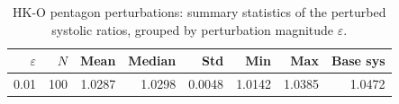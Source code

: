 \begin{table}[h]
\centering
\begin{tabular}{rrrrrrrr}
\toprule
$\varepsilon$ & $N$ & Mean & Median & Std & Min & Max & Base sys \\
\midrule
0.01 & 100 & 1.0287 & 1.0298 & 0.0048 & 1.0142 & 1.0385 & 1.0472 \\
\bottomrule
\end{tabular}
\caption{HK-O pentagon perturbations: summary statistics of the perturbed systolic ratios, grouped by perturbation magnitude $\varepsilon$.}
\label{tab:pentagon-perturb-stats}
\end{table}
